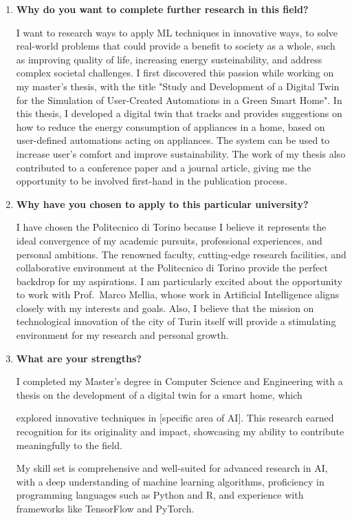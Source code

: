 \begin{enumerate}
    \item \textbf{Why do you want to complete further research in this field?}

    I want to research ways to apply ML techniques in innovative ways, to solve real-world problems that could provide a benefit to society as a whole, such as improving quality of life, increasing energy susteinability, and address complex societal challenges. I first discovered this passion while working on my master's thesis, with the title "Study and Development of a Digital Twin for the Simulation of User-Created Automations in a Green Smart Home". In this thesis, I developed a digital twin that tracks and provides suggestions on how to reduce the energy consumption of appliances in a home, based on user-defined automations acting on appliances. The system can be used to increase user's comfort and improve sustainability. The work of my thesis also contributed to a conference paper and a journal article, giving me the opportunity to be involved first-hand in the publication process.

    \item \textbf{Why have you chosen to apply to this particular university?}

    I have chosen the Politecnico di Torino because I believe it represents the ideal convergence of my academic pursuits, professional experiences, and personal ambitions. The renowned faculty, cutting-edge research facilities, and collaborative environment at the Politecnico di Torino provide the perfect backdrop for my aspirations. I am particularly excited about the opportunity to work with Prof.\ Marco Mellia, whose work in Artificial Intelligence aligns closely with my interests and goals. Also, I believe that the mission on technological innovation of the city of Turin itself will provide a stimulating environment for my research and personal growth.

    \item \textbf{What are your strengths?}

    I completed my Master's degree in Computer Science and Engineering with a thesis on the development of a digital twin for a smart home, which 
    
    explored innovative techniques in [specific area of AI]. This research earned recognition for its originality and impact, showcasing my ability to contribute meaningfully to the field.
    
    My skill set is comprehensive and well-suited for advanced research in AI, with a deep understanding of machine learning algorithms, proficiency in programming languages such as Python and R, and experience with frameworks like TensorFlow and PyTorch. 


\end{enumerate}
